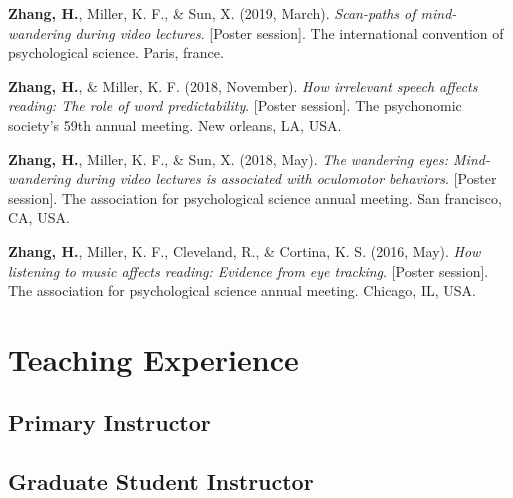 \documentclass[11pt,a4paper,]{awesome-cv}
\begin{document}
\leavevmode{}%
\textbf{Zhang, H.}, Miller, K. F., \& Sun, X. (2019, March).
\emph{Scan-paths of mind-wandering during video lectures}. {[}Poster
session{]}. The international convention of psychological science.
Paris, france.

\leavevmode{}%
\textbf{Zhang, H.}, \& Miller, K. F. (2018, November). \emph{How
irrelevant speech affects reading: The role of word predictability}.
{[}Poster session{]}. The psychonomic society's 59th annual meeting. New
orleans, LA, USA.

\leavevmode{}%
\textbf{Zhang, H.}, Miller, K. F., \& Sun, X. (2018, May). \emph{The
wandering eyes: Mind-wandering during video lectures is associated with
oculomotor behaviors}. {[}Poster session{]}. The association for
psychological science annual meeting. San francisco, CA, USA.

\leavevmode{}%
\textbf{Zhang, H.}, Miller, K. F., Cleveland, R., \& Cortina, K. S.
(2016, May). \emph{How listening to music affects reading: Evidence from
eye tracking}. {[}Poster session{]}. The association for psychological
science annual meeting. Chicago, IL, USA.

\hypertarget{teaching-experience}{%
\section{Teaching Experience}\label{teaching-experience}}

\hypertarget{primary-instructor}{%
\subsection{Primary Instructor}\label{primary-instructor}}

\begin{cventries}
    \vspace{-4.0mm}
\end{cventries}

\hypertarget{graduate-student-instructor}{%
\subsection{Graduate Student
Instructor}\label{graduate-student-instructor}}
\end{document}
